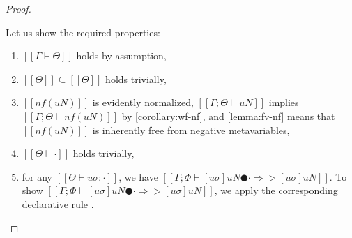 \begin{proof}
\begin{caseof}
        Let us show the required properties: 
        \begin{enumerate}
            \item $[[Γ ⊢ Θ]]$ holds by assumption,
            \item $[[Θ]] \subseteq [[Θ]]$ holds trivially,
            \item $[[nf(uN)]]$ is evidently normalized, 
                $[[Γ; Θ ⊢ uN]]$ implies $[[Γ; Θ ⊢ nf(uN)]]$ by 
                \cref{corollary:wf-nf},
                and \cref{lemma:fv-nf} means that $[[nf(uN)]]$ is 
                inherently free from negative metavariables,
            \item $[[Θ ⊢ ·]]$ holds trivially,
            \item for any $[[Θ ⊢ uσ : ·]]$, we have $[[ Γ ; Φ ⊢ [uσ]uN ● · ⇒> [uσ]uN ]]$.
                To show $[[ Γ ; Φ ⊢ [uσ]uN ● · ⇒> [uσ]uN ]]$, we apply the corresponding 
                declarative rule . 
        \end{enumerate}


\end{caseof}
\end{proof}
